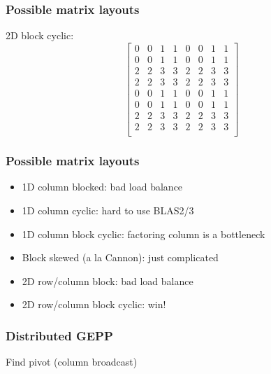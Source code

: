 \documentclass{beamer}
\begin{document}
\begin{frame}
  \frametitle{Possible matrix layouts}

  2D block cyclic:
  \[
  \begin{bmatrix}
    0 & 0 & 1 & 1 & 0 & 0 & 1 & 1 \\
    0 & 0 & 1 & 1 & 0 & 0 & 1 & 1 \\
    2 & 2 & 3 & 3 & 2 & 2 & 3 & 3 \\
    2 & 2 & 3 & 3 & 2 & 2 & 3 & 3 \\
    0 & 0 & 1 & 1 & 0 & 0 & 1 & 1 \\
    0 & 0 & 1 & 1 & 0 & 0 & 1 & 1 \\
    2 & 2 & 3 & 3 & 2 & 2 & 3 & 3 \\
    2 & 2 & 3 & 3 & 2 & 2 & 3 & 3 \\
  \end{bmatrix}
  \]
\end{frame}



\begin{frame}
  \frametitle{Possible matrix layouts}

  \begin{itemize}
  \item 1D column blocked: bad load balance
  \item 1D column cyclic: hard to use BLAS2/3
  \item 1D column block cyclic: factoring column is a bottleneck
  \item Block skewed (a la Cannon): just complicated
  \item 2D row/column block: bad load balance
  \item 2D row/column block cyclic: win!
  \end{itemize}
\end{frame}


\begin{frame}
  \frametitle{Distributed GEPP}

  \begin{center}

    Find pivot (column broadcast)
  \end{center}
\end{frame}
\end{document}
